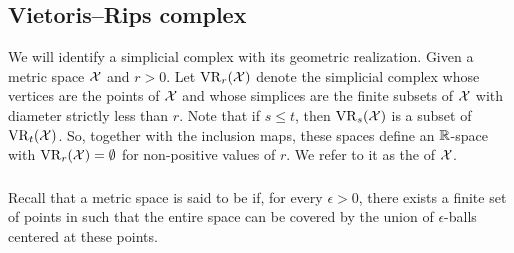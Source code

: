 %
%
%

\subsection{Vietoris--Rips complex}\label{ss:vietoris-rips}

We will identify a simplicial complex with its geometric realization.
Given a metric space $\mathcal{X}$ and $r > 0$.
Let $\operatorname{VR}_r(\mathcal{X})$ denote the simplicial complex whose vertices are the points of $\mathcal{X}$ and whose simplices are the finite subsets of $\mathcal{X}$ with diameter strictly less than $r$.
Note that if $s \leq t$, then $\operatorname{VR}_s(\mathcal{X})$ is a subset of $\operatorname{VR}_t(\mathcal{X})$.
So, together with the inclusion maps, these spaces define an $\mathbb{R}$-space with $\operatorname{VR}_r(\mathcal{X}) = \emptyset$ for non-positive values of $r$.
We refer to it as the  of $\mathcal{X}$.

\subsubsection{} Recall that a metric space is said to be  if, for every $\epsilon > 0$, there exists a finite set of points in such that the entire space can be covered by the union of $\epsilon$-balls centered at these points.

